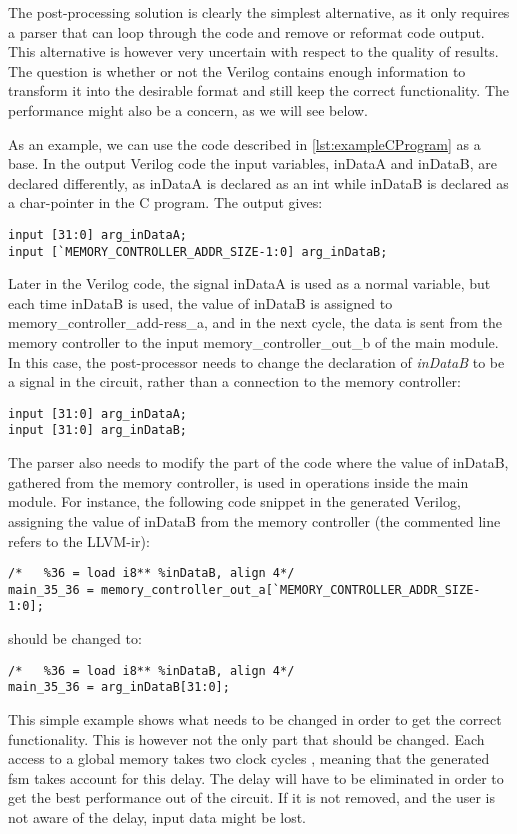 The post-processing solution is clearly the simplest alternative, as it only requires a parser that can loop through the code and remove or reformat code output. This alternative is however very uncertain with respect to the quality of results. The question is whether or not the Verilog contains enough information to transform it into the desirable format and still keep the correct functionality. The performance might also be a concern, as we will see below.

As an example, we can use the code described in \cref{lst:exampleCProgram} as a base. In the output Verilog code the input variables, inDataA and inDataB, are declared differently, as inDataA is declared as an int while inDataB is declared as a char-pointer in the C program. The output gives:
\lstset{language=Verilog, style=Verilogstyle}
\begin{lstlisting}
input [31:0] arg_inDataA;
input [`MEMORY_CONTROLLER_ADDR_SIZE-1:0] arg_inDataB;
\end{lstlisting}
Later in the Verilog code, the signal inDataA is used as a normal variable, but each time inDataB is used, the value of inDataB is assigned to memory\_controller\_add-ress\_a, and in the next cycle, the data is sent from the memory controller to the input memory\_controller\_out\_b of the main module. In this case, the post-processor needs to change the declaration of \textit{inDataB} to be a signal in the circuit, rather than a connection to the memory controller:
\begin{lstlisting}
input [31:0] arg_inDataA;
input [31:0] arg_inDataB;
\end{lstlisting}
The parser also needs to modify the part of the code where the value of inDataB, gathered from the memory controller, is used in operations inside the main module. For instance, the following code snippet in the generated Verilog, assigning the value of inDataB from the memory controller (the commented line refers to the LLVM-\gls{ir}):
\begin{lstlisting}
/*   %36 = load i8** %inDataB, align 4*/
main_35_36 = memory_controller_out_a[`MEMORY_CONTROLLER_ADDR_SIZE-1:0];
\end{lstlisting}
should be changed to:
\begin{lstlisting}
/*   %36 = load i8** %inDataB, align 4*/
main_35_36 = arg_inDataB[31:0];
\end{lstlisting}
This simple example shows what needs to be changed in order to get the correct functionality. This is however not the only part that should be changed. Each access to a global memory takes two clock cycles \cite{leguparch}, meaning that the generated \gls{fsm} takes account for this delay. The delay will have to be eliminated in order to get the best performance out of the circuit. If it is not removed, and the user is not aware of the delay, input data might be lost.

